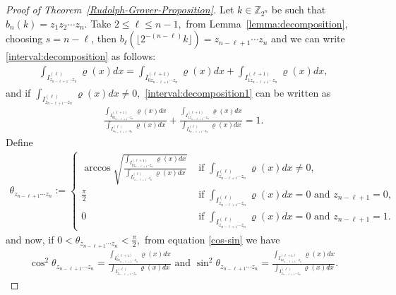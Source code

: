 \documentclass[a4paper,11pt]{article}
\begin{document}
\begin{proof}[Proof of Theorem~\ref{Rudolph-Grover-Proposition}]
  Let $k \in \mathbb{Z}_{2^n}$ be such that $b_n(k)=z_1z_2\cdots z_n.$ Take $2 \le \ell \le n-1,$ from Lemma~\ref{lemma:decomposition}, choosing $s=n-\ell$, then $b_{\ell}(\lfloor 2^{-(n-\ell)}k \rfloor)=z_{n-\ell+1}\cdots z_n$ and we can write \eqref{interval:decomposition} as follows:
  \begin{align}\label{interval:decomposition1}
      \int_{I_{z_{n-\ell+1}\cdots z_n}^{(\ell)}} \varrho(x) dx =   \int_{I_{0z_{n-\ell+1}\cdots z_n}^{(\ell+1)}} \varrho(x) dx  +  \int_{I_{1z_{n-\ell+1}\cdots z_n}^{(\ell+1)}} \varrho(x) dx,
  \end{align}
  and if $ \int_{I_{z_{n-\ell+1}\cdots z_n}^{(\ell)}} \varrho(x) dx \neq 0,$ \eqref{interval:decomposition1} can be written as
  \begin{align}\label{cos-sin}
  \frac{\int_{I_{0z_{n-\ell+1}\cdots z_n}^{(\ell+1)}} \varrho(x) dx}{  \int_{I_{z_{n-\ell+1}\cdots z_n}^{(\ell)}} \varrho(x) dx} 
  + \frac{\int_{I_{1z_{n-\ell+1}\cdots z_n}^{(\ell+1)}} \varrho(x) dx}{\int_{I_{z_{n-\ell+1}\cdots z_n}^{(\ell)}} \varrho(x) dx} = 1.
  \end{align}
  Define
  \begin{align*}
  \theta_{z_{n-\ell+1}\cdots z_n} := 
  \left\{
    \begin{array}{ll}
    \arccos \sqrt{\frac{\int_{I_{0z_{n-\ell+1}\cdots z_n}^{(\ell+1)}} \varrho(x) dx}{ \int_{I_{z_{n-\ell+1}\cdots z_n}^{(\ell)}} \varrho(x) dx}} & \text{ if } \int_{I_{z_{n-\ell+1}\cdots z_n}^{(\ell)}} \varrho(x) dx \neq 0, \\
    \frac{\pi}{2} & \text{ if } \int_{I_{z_{n-\ell+1}\cdots z_n}^{(\ell)}} \varrho(x) dx = 0 \text{ and } z_{n-\ell+1} = 0, \\
    0 & \text{ if } \int_{I_{z_{n-\ell+1}\cdots z_n}^{(\ell)}} \varrho(x) dx = 0 \text{ and } z_{n-\ell+1} = 1.
\end{array}
\right.
\end{align*}
  and now, if $0 < \theta_{z_{n-\ell+1}\cdots z_n} < \frac{\pi}{2},$  from equation \eqref{cos-sin} we have 
  \begin{align*}
     \cos^2 \theta_{z_{n-\ell+1}\cdots z_n}  =  \frac{\int_{I_{0z_{n-\ell+1}\cdots z_n}^{(\ell+1)}} \varrho(x) dx}{  \int_{I_{z_{n-\ell+1}\cdots z_n}^{(\ell)}} \varrho(x) dx} \text{ and }  
     \sin^2 \theta_{z_{n-\ell+1}\cdots z_n} = \frac{\int_{I_{1z_{n-\ell+1}\cdots z_n}^{(\ell+1)}} \varrho(x) dx}{\int_{I_{z_{n-\ell+1}\cdots z_n}^{(\ell)}} \varrho(x) dx}.

\end{align*}
\end{proof}
\end{document}
